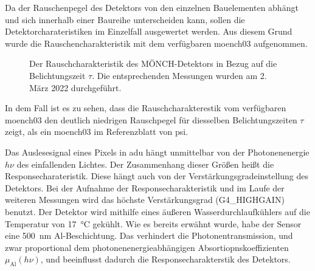 \noindent
Da der Rauschenpegel des Detektors von den einzelnen Bauelementen abhängt und sich innerhalb einer Baureihe unterscheiden kann, sollen die  Detektorcharateristiken im Einzelfall ausgewertet werden. Aus diesem Grund wurde die Rauschencharakteristik mit dem verfügbaren \gls{moench03} aufgenommen.
\begin{figure}[H]
    \centering
    
    \caption{Der Rauschcharakteristik des MÖNCH-Detektors in Bezug auf die Belichtungszeit $\tau$. Die entsprechenden Messungen wurden am 2. März 2022 durchgeführt.}
    \label{fig:noise_moench}
\end{figure}
\noindent
In dem Fall ist es zu sehen, dass die Rauschcharakterestik vom verfügbaren \gls{moench03} den deutlich niedrigen Rauschpegel für diesselben Belichtungszeiten $\tau$ zeigt, als ein \gls{moench03} im Referenzblatt \cite{ramilli_measurements_2017} von \gls{psi}.

\noindent
Das Auslesesignal eines Pixels in \gls{adu} hängt unmittelbar von der Photonenenergie $h\nu$ des einfallenden Lichtes. Der Zusammenhang dieser Größen heißt die Responsecharateristik. Diese hängt auch von der Verstärkungsgradeinstellung des Detektors. Bei der Aufnahme der Responsecharakteristik und im Laufe der weiteren Messungen wird das höchste Verstärkungsgrad (G4\_HIGHGAIN) benutzt. Der Detektor wird mithilfe eines äußeren Wasserdurchlaufkühlers auf die Temperatur von \SI{17}{\celsius} gekühlt. Wie es bereits erwähnt wurde, habe der Sensor eine \SI{500}{\nano\meter} Al-Beschichtung. Das verhindert die Photonentransmission, und zwar proportional dem photonenenergieabhängigen Absortiopnskoeffizienten $\mu_\text{Al}(h\nu)$, und beeinflusst dadurch die Responsecharakterstik des Detektors.
%     

